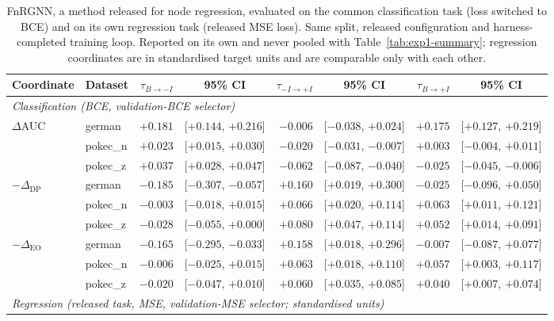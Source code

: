 \begin{table}[t]
\centering
\caption{FnRGNN, a method released for node regression, evaluated on the common classification task (loss switched to BCE) and on its own regression task (released MSE loss). Same split, released configuration and harness-completed training loop. Reported on its own and never pooled with Table~\ref{tab:exp1-summary}; regression coordinates are in standardised target units and are comparable only with each other.}
\label{tab:exp1-1-fnrgnn}
\vspace{-0.2cm}
\scriptsize
\begin{tabular}{llrcrcrc}
\toprule
Coordinate & Dataset & $\tau_{B\rightarrow -I}$ & 95\% CI & $\tau_{-I\rightarrow +I}$ & 95\% CI & $\tau_{B\rightarrow +I}$ & 95\% CI \\
\midrule
\multicolumn{8}{l}{\textit{Classification (BCE, validation-BCE selector)}} \\
$\Delta$AUC & german & $+0.181$ & [$+0.144$, $+0.216$] & $-0.006$ & [$-0.038$, $+0.024$] & $+0.175$ & [$+0.127$, $+0.219$] \\
 & pokec\_n & $+0.023$ & [$+0.015$, $+0.030$] & $\mathbf{-0.020}$ & [$-0.031$, $-0.007$] & $+0.003$ & [$-0.004$, $+0.011$] \\
 & pokec\_z & $+0.037$ & [$+0.028$, $+0.047$] & $\mathbf{-0.062}$ & [$-0.087$, $-0.040$] & $-0.025$ & [$-0.045$, $-0.006$] \\
\cmidrule(l){1-8}
$-\Delta_{\mathrm{DP}}$ & german & $-0.185$ & [$-0.307$, $-0.057$] & $\mathbf{+0.160}$ & [$+0.019$, $+0.300$] & $-0.025$ & [$-0.096$, $+0.050$] \\
 & pokec\_n & $-0.003$ & [$-0.018$, $+0.015$] & $\mathbf{+0.066}$ & [$+0.020$, $+0.114$] & $+0.063$ & [$+0.011$, $+0.121$] \\
 & pokec\_z & $-0.028$ & [$-0.055$, $+0.000$] & $\mathbf{+0.080}$ & [$+0.047$, $+0.114$] & $+0.052$ & [$+0.014$, $+0.091$] \\
\cmidrule(l){1-8}
$-\Delta_{\mathrm{EO}}$ & german & $-0.165$ & [$-0.295$, $-0.033$] & $\mathbf{+0.158}$ & [$+0.018$, $+0.296$] & $-0.007$ & [$-0.087$, $+0.077$] \\
 & pokec\_n & $-0.006$ & [$-0.025$, $+0.015$] & $\mathbf{+0.063}$ & [$+0.018$, $+0.110$] & $+0.057$ & [$+0.003$, $+0.117$] \\
 & pokec\_z & $-0.020$ & [$-0.047$, $+0.010$] & $\mathbf{+0.060}$ & [$+0.035$, $+0.085$] & $+0.040$ & [$+0.007$, $+0.074$] \\
\midrule
\multicolumn{8}{l}{\textit{Regression (released task, MSE, validation-MSE selector; standardised units)}} \\

\end{tabular}
\end{table}
